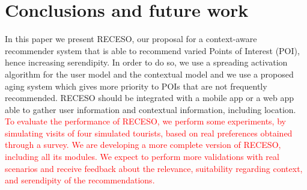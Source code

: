 \section{Conclusions and future work} \label{section:conclu}

In this paper we present RECESO, our proposal for a context-aware recommender system that is able to recommend varied Points of Interest (POI), hence increasing serendipity. In order to do so, we use a spreading activation algorithm for the user model and the contextual model and we use a proposed aging system which gives more priority to POIs that are not frequently recommended. RECESO should be integrated with a mobile app or a web app able to gather user information and contextual information, including location. \textcolor{red}{To evaluate the performance of RECESO, we perform some experiments, by simulating visits of four simulated tourists, based on real preferences obtained through a survey. We are developing a more complete version of RECESO, including all its modules. We expect to perform more validations with real scenarios and receive feedback about the relevance, suitability regarding context, and serendipity of the recommendations.}

